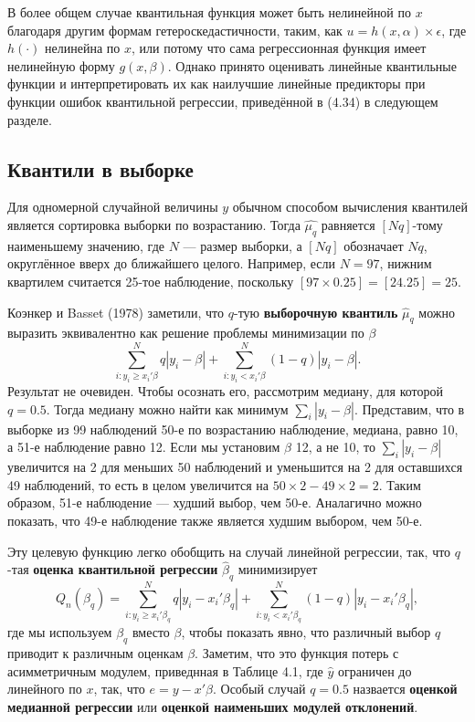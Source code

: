 В более общем случае квантильная функция может быть нелинейной по $x$ благодаря другим формам гетероскедастичности, таким, как $u=h(x,\alpha) \times \epsilon$, где $h(\cdot)$ нелинейна по $x$, или потому что сама регрессионная функция имеет нелинейную форму $g(x, \beta)$. Однако принято оценивать линейные квантильные функции и интерпретировать их как наилучшие линейные предикторы при функции ошибок квантильной регрессии, приведённой в (4.34) в следующем разделе.  

\subsection{Квантили в выборке}

Для одномерной случайной величины $y$ обычном способом вычисления квантилей является сортировка выборки по возрастанию. Тогда $\hat{\mu_q}$ равняется $[Nq]$-тому наименьшему значению, где $N$ --- размер выборки, а  $[Nq]$ обозначает $Nq$, округлённое вверх до ближайшего целого. Например, если $N=97$, нижним квартилем считается 25-тое наблюдение, поскольку $[97 \times 0.25] =[24.25] = 25$.

Коэнкер и Basset (1978) заметили, что $q$-тую \textbf{выборочную квантиль} $\hat{\mu}_q$ можно выразить эквивалентно как решение проблемы минимизации по $\beta$
$$\sum_{i:y_i \geq x_i'\beta}^{N} q|y_i-\beta| + \sum_{i:y_i < x_i'\beta}^{N} (1-q)|y_i-\beta|. $$
Результат не очевиден. Чтобы осознать его, рассмотрим медиану, для которой $q=0.5$. Тогда медиану можно найти как минимум $\sum_i |y_i -\beta|$. Представим, что в выборке из 99 наблюдений 50-е по возрастанию наблюдение, медиана, равно 10, а 51-е наблюдение равно 12. Если мы установим $\beta$ 12, а не 10, то $\sum_i |y_i -\beta|$ увеличится на 2 для меньших 50 наблюдений и уменьшится на 2 для оставшихся 49 наблюдений, то есть в целом увеличится на $50 \times 2 - 49 \times 2 = 2$. Таким образом, 51-е наблюдение --- худший выбор, чем 50-е. Аналагично можно показать, что 49-е наблюдение также является худшим выбором, чем 50-е.

Эту целевую функцию легко обобщить на случай линейной регрессии, так, что $q$-тая \textbf{оценка квантильной регрессии} $\hat{\beta}_q$ минимизирует
\begin{equation}
Q_n(\beta_q) = \sum_{i:y_i \geq x_i'\beta_q}^{N} q|y_i-x_i'\beta_q| + \sum_{i:y_i < x_i'\beta_q}^{N} (1-q)|y_i-x_i'\beta_q|,
\end{equation}
где мы используем $\beta_q$ вместо $\beta$, чтобы показать явно, что различный выбор $q$ приводит к различным оценкам $\beta$. Заметим, что это функция потерь с асимметричным модулем, приведнная в Таблице 4.1, где $\hat{y}$ ограничен до линейного по $x$, так, что $e = y -x'\beta$.  Особый случай $q=0.5$ назвается \textbf{оценкой медианной регрессии} или \textbf{оценкой наименьших модулей отклонений}. 


